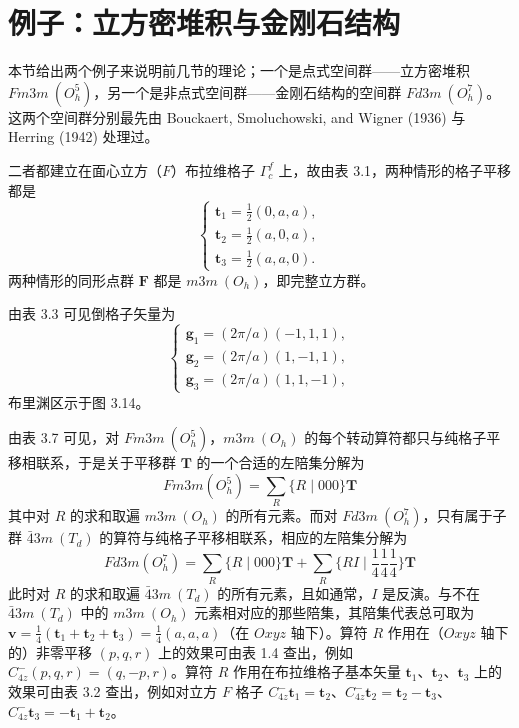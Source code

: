 \section{例子：立方密堆积与金刚石结构}

本节给出两个例子来说明前几节的理论；一个是点式空间群——立方密堆积 $Fm3m\ (O^{5}_{h})$，另一个是非点式空间群——金刚石结构的空间群 $Fd3m\ (O^{7}_{h})$。这两个空间群分别最先由 Bouckaert, Smoluchowski, and Wigner (1936) 与 Herring (1942) 处理过。

二者都建立在面心立方（$F$）布拉维格子 $\Gamma^{f}_{c}$ 上，故由表 3.1，两种情形的格子平移都是
\begin{equation*}
\left\{
\begin{array}{l}
\mathbf{t}_{1} = \frac{1}{2}(0, a, a),\\
\mathbf{t}_{2} = \frac{1}{2}(a, 0, a),\\
\mathbf{t}_{3} = \frac{1}{2}(a, a, 0).
\end{array}
\right.
\tag{3.8.1}
\end{equation*}
两种情形的同形点群 $\mathbf{F}$ 都是 $m3m\ (O_{h})$，即完整立方群。

由表 3.3 可见倒格子矢量为
\begin{equation*}
\left\{
\begin{array}{l}
\mathbf{g}_{1} = (2\pi/a)(-1, 1, 1),\\
\mathbf{g}_{2} = (2\pi/a)(1, -1, 1),\\
\mathbf{g}_{3} = (2\pi/a)(1, 1, -1),
\end{array}
\right.
\tag{3.8.2}
\end{equation*}
布里渊区示于图 3.14。

由表 3.7 可见，对 $Fm3m\ (O^{5}_{h})$，$m3m\ (O_{h})$ 的每个转动算符都只与纯格子平移相联系，于是关于平移群 $\mathbf{T}$ 的一个合适的左陪集分解为
\begin{equation*}
Fm3m\left(O^{5}_{h}\right) = \sum_{R}\{R \mid 000\}\mathbf{T}
\tag{3.8.3}
\end{equation*}
其中对 $R$ 的求和取遍 $m3m\ (O_{h})$ 的所有元素。而对 $Fd3m\ (O^{7}_{h})$，只有属于子群 $\bar{4}3m\ (T_{d})$ 的算符与纯格子平移相联系，相应的左陪集分解为
\begin{equation*}
Fd3m\left(O^{7}_{h}\right) = \sum_{R}\{R \mid 000\}\mathbf{T} + \sum_{R}\{RI \mid {\textstyle\frac{1}{4}}{\textstyle\frac{1}{4}}{\textstyle\frac{1}{4}}\}\mathbf{T}
\tag{3.8.4}
\end{equation*}
此时对 $R$ 的求和取遍 $\bar{4}3m\ (T_{d})$ 的所有元素，且如通常，$I$ 是反演。与不在 $\bar{4}3m\ (T_{d})$ 中的 $m3m\ (O_{h})$ 元素相对应的那些陪集，其陪集代表总可取为 $\mathbf{v} = \frac{1}{4}(\mathbf{t}_{1} + \mathbf{t}_{2} + \mathbf{t}_{3}) = \frac{1}{4}(a, a, a)$（在 $Oxyz$ 轴下）。算符 $R$ 作用在（$Oxyz$ 轴下的）非零平移 $(p, q, r)$ 上的效果可由表 1.4 查出，例如 $C^{-}_{4z}(p, q, r) = (q, -p, r)$。算符 $R$ 作用在布拉维格子基本矢量 $\mathbf{t}_{1}$、$\mathbf{t}_{2}$、$\mathbf{t}_{3}$ 上的效果可由表 3.2 查出，例如对立方 $F$ 格子 $C^{-}_{4z}\mathbf{t}_{1} = \mathbf{t}_{2}$、$C^{-}_{4z}\mathbf{t}_{2} = \mathbf{t}_{2} - \mathbf{t}_{3}$、$C^{-}_{4z}\mathbf{t}_{3} = -\mathbf{t}_{1} + \mathbf{t}_{2}$。


